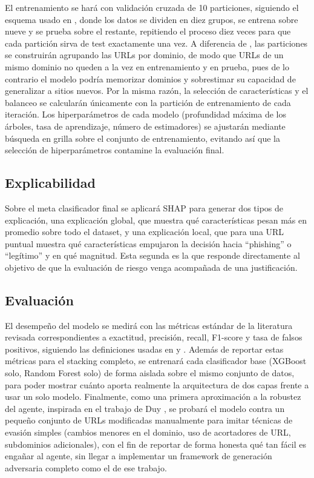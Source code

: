 El entrenamiento se hará con validación cruzada de 10 particiones, siguiendo el esquema usado en \cite{alsariera2020ai}, donde los datos se dividen en diez grupos, se entrena sobre nueve y se prueba sobre el restante, repitiendo el proceso diez veces para que cada partición sirva de test exactamente una vez. A diferencia de \cite{alsariera2020ai}, las particiones se construirán agrupando las URLs por dominio, de modo que URLs de un mismo dominio no queden a la vez en entrenamiento y en prueba, pues de lo contrario el modelo podría memorizar dominios y sobrestimar su capacidad de generalizar a sitios nuevos. Por la misma razón, la selección de características y el balanceo se calcularán únicamente con la partición de entrenamiento de cada iteración. Los hiperparámetros de cada modelo (profundidad máxima de los árboles, tasa de aprendizaje, número de estimadores) se ajustarán mediante búsqueda en grilla sobre el conjunto de entrenamiento, evitando así que la selección de hiperparámetros contamine la evaluación final.

\subsection{Explicabilidad}

Sobre el meta clasificador final se aplicará SHAP para generar dos tipos de explicación, una explicación global, que muestra qué características pesan más en promedio sobre todo el dataset, y una explicación local, que para una URL puntual muestra qué características empujaron la decisión hacia ``phishing'' o ``legítimo'' y en qué magnitud. Esta segunda es la que responde directamente al objetivo de que la evaluación de riesgo venga acompañada de una justificación.

\subsection{Evaluación}

El desempeño del modelo se medirá con las métricas estándar de la literatura revisada correspondientes a exactitud, precisión, recall, F1-score y tasa de falsos positivos, siguiendo las definiciones usadas en \cite{kalabarige2023boosting} y \cite{alsariera2020ai}. Además de reportar estas métricas para el stacking completo, se entrenará cada clasificador base (XGBoost solo, Random Forest solo) de forma aislada sobre el mismo conjunto de datos, para poder mostrar cuánto aporta realmente la arquitectura de dos capas frente a usar un solo modelo. Finalmente, como una primera aproximación a la robustez del agente, inspirada en el trabajo de Duy \cite{duy2024study}, se probará el modelo contra un pequeño conjunto de URLs modificadas manualmente para imitar técnicas de evasión simples (cambios menores en el dominio, uso de acortadores de URL, subdominios adicionales), con el fin de reportar de forma honesta qué tan fácil es engañar al agente, sin llegar a implementar un framework de generación adversaria completo como el de ese trabajo.
